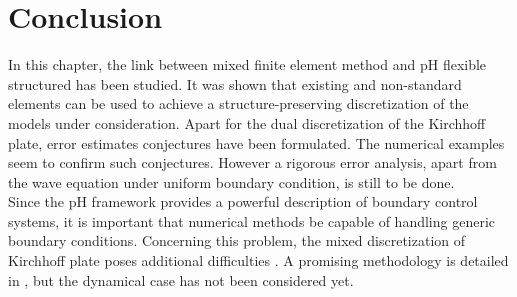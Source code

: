 \section{Conclusion}
In this chapter, the link between mixed finite element method and pH flexible structured has been studied. It was shown that existing and non-standard elements can be used to achieve a structure-preserving discretization of the models under consideration.  Apart for the dual discretization of the Kirchhoff plate, error estimates conjectures have been formulated. The numerical examples seem to confirm such conjectures. However a rigorous error analysis, apart from the wave equation \cite{haine2020} under uniform boundary condition, is still to be done. \\


Since the pH framework provides a powerful description of boundary control systems, it is important that numerical methods be capable of handling generic boundary conditions. Concerning this problem, the mixed discretization of Kirchhoff plate poses additional difficulties \cite{blum1990}.  A promising methodology is detailed in \cite{rafetseder2018siam}, but the dynamical case has not been considered yet. 